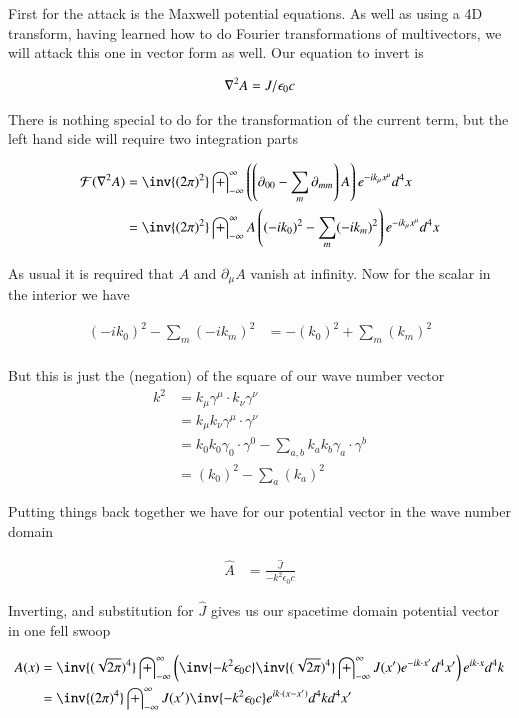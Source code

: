 \documentclass{article}
\newcommand{\FF}[0]{\mathcal{F}}
\newcommand{\IIinf}[0]{ \int_{-\infty}^\infty }
\begin{document}
First for the attack is the Maxwell potential equations.  As well as using a 4D transform, having learned how to do Fourier
transformations of multivectors, we will attack this one in vector form as well.  Our equation to invert is

\begin{align*}
\nabla^2 A = J/\epsilon_0 c
\end{align*}

There is nothing special to do for the transformation of the current term, but the left hand side will require two integration
parts

\begin{align*}
\FF(\grad^2 A )
&= \inv{(2 \pi)^2} \IIinf \left(\left(\partial_{00} - \sum_m \partial_{mm}\right) A \right) e^{ -i k_\mu x^\mu } d^4 x \\
&= \inv{(2 \pi)^2} \IIinf A \left( (-i k_0)^2 - \sum_m (-i k_m)^2 \right) e^{ -i k_\mu x^\mu } d^4 x \\
\end{align*}

As usual it is required that $A$ and $\partial_\mu A$ vanish at infinity.  Now for the scalar in the interior we have

\begin{align*}
(-i k_0)^2 - \sum_m (-i k_m)^2 
&= -(k_0)^2 + \sum_m (k_m)^2 \\
\end{align*}

But this is just the (negation) of the square of our wave number vector
\begin{align*}
k^2 
&= k_\mu \gamma^\mu \cdot k_\nu \gamma^\nu \\
&= k_\mu k_\nu \gamma^\mu \cdot \gamma^\nu \\
&= 
k_0 k_0 \gamma_0 \cdot \gamma^0 
-\sum_{a,b} k_a k_b \gamma_a \cdot \gamma^b \\
&= (k_0)^2 - \sum_a (k_a)^2
\end{align*}

Putting things back together we have for our potential vector in the wave number domain

\begin{align*}
\hat{A} &= \frac{\hat{J}}{- k^2 \epsilon_0 c}
\end{align*}

Inverting, and substitution for $\hat{J}$ gives us our spacetime domain potential vector in one fell swoop

\begin{align*}
A(x)
&= 
\inv{(\sqrt{2\pi})^4} \IIinf 
\left(
\inv{- k^2 \epsilon_0 c} \inv{(\sqrt{2\pi})^4} \IIinf {J}(x') e^{-i k \cdot x' } d^4 x'
\right)
e^{ i k \cdot x } d^4 k \\
&= 
\inv{({2\pi})^4} \IIinf {J}(x') \inv{- k^2 \epsilon_0 c} e^{ i k \cdot (x - x') } d^4 k d^4 x'
\\
\end{align*}
\end{document}
